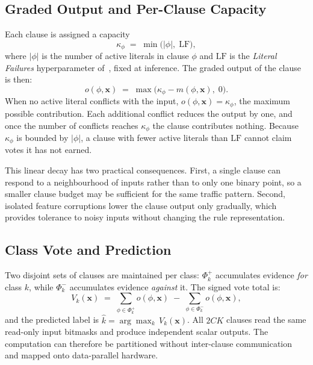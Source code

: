 \documentclass[journal,twoside,web]{ieeecolor}
\begin{document}
\subsection{Graded Output and Per-Clause Capacity}
\label{sec:fptm-graded}
Each clause is assigned a capacity
%
\begin{equation}
  \kappa_{\phi} \;=\; \min\!\bigl(|\phi|,\;\mathrm{LF}\bigr),
  \label{eq:kappa}
\end{equation}
%
where $|\phi|$ is the number of active literals in clause $\phi$ and
$\mathrm{LF}$ is the \emph{Literal Failures} hyperparameter
of~\cite{hnilov2025fptm}, fixed at inference. The graded output of
the clause is then:
%
\begin{equation}
  o(\phi,\mathbf{x})
  \;=\; \max\!\bigl(\kappa_{\phi} - m(\phi,\mathbf{x}),\;0\bigr).
  \label{eq:graded}
\end{equation}
%
When no active literal conflicts with the input,
$o(\phi,\mathbf{x}) = \kappa_{\phi}$, the maximum possible
contribution. Each additional conflict reduces the output by one,
and once the number of conflicts reaches $\kappa_{\phi}$ the clause
contributes nothing. Because $\kappa_{\phi}$ is bounded by
$|\phi|$, a clause with fewer active literals than $\mathrm{LF}$
cannot claim votes it has not earned.

This linear decay has two practical consequences. First, a single
clause can respond to a neighbourhood of inputs rather than to only
one binary point, so a smaller clause budget may be sufficient for
the same traffic pattern. Second, isolated feature corruptions lower
the clause output only gradually, which provides tolerance to noisy
inputs without changing the rule representation.

\subsection{Class Vote and Prediction}
\label{sec:fptm-vote}
Two disjoint sets of clauses are maintained per class: $\Phi_{k}^{+}$
accumulates evidence \emph{for} class $k$, while $\Phi_{k}^{-}$
accumulates evidence \emph{against} it. The signed vote total is:
%
\begin{equation}
  V_{k}(\mathbf{x})
  \;=\;
  \sum_{\phi \in \Phi_{k}^{+}} o(\phi,\mathbf{x})
  \;-\;
  \sum_{\phi \in \Phi_{k}^{-}} o(\phi,\mathbf{x}),
  \label{eq:vote}
\end{equation}
%
and the predicted label is $\hat{k} = \arg\max_{k}\,V_{k}(\mathbf{x})$.
All $2CK$ clauses read the same read-only input bitmasks and produce
independent scalar outputs. The computation can therefore be
partitioned without inter-clause communication and mapped onto
data-parallel hardware.
\end{document}
